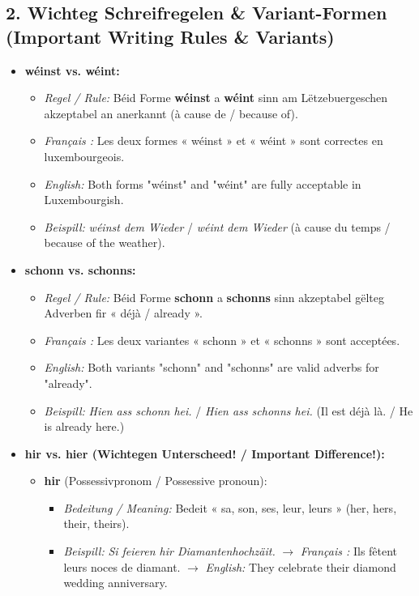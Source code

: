 \subsection*{2. Wichteg Schreifregelen \& Variant-Formen (Important Writing Rules \& Variants)}
\begin{itemize}
    \item \textbf{wéinst vs. wéint:}
    \begin{itemize}
        \item \textit{Regel / Rule:} Béid Forme \textbf{wéinst} a \textbf{wéint} sinn am Lëtzebuergeschen akzeptabel an anerkannt (à cause de / because of).
        \item \textit{Français :} Les deux formes « wéinst » et « wéint » sont correctes en luxembourgeois.
        \item \textit{English:} Both forms "wéinst" and "wéint" are fully acceptable in Luxembourgish.
        \item \textit{Beispill:} \textit{wéinst dem Wieder} / \textit{wéint dem Wieder} (à cause du temps / because of the weather).
    \end{itemize}

    \vspace{0.6em}

    \item \textbf{schonn vs. schonns:}
    \begin{itemize}
        \item \textit{Regel / Rule:} Béid Forme \textbf{schonn} a \textbf{schonns} sinn akzeptabel gëlteg Adverben fir « déjà / already ».
        \item \textit{Français :} Les deux variantes « schonn » et « schonns » sont acceptées.
        \item \textit{English:} Both variants "schonn" and "schonns" are valid adverbs for "already".
        \item \textit{Beispill:} \textit{Hien ass schonn hei.} / \textit{Hien ass schonns hei.} (Il est déjà là. / He is already here.)
    \end{itemize}

    \vspace{0.6em}

    \item \textbf{hir vs. hier (Wichtegen Unterscheed! / Important Difference!):}
    \begin{itemize}
        \item \textbf{hir} (Possessivpronom / Possessive pronoun):
        \begin{itemize}
            \item \textit{Bedeitung / Meaning:} Bedeit « sa, son, ses, leur, leurs » (her, hers, their, theirs).
            \item \textit{Beispill:} \textit{Si feieren hir Diamantenhochzäit.}
            $\rightarrow$ \textit{Français :} Ils fêtent leurs noces de diamant.
            $\rightarrow$ \textit{English:} They celebrate their diamond wedding anniversary.
        \end{itemize}


\end{itemize}
\end{itemize}
